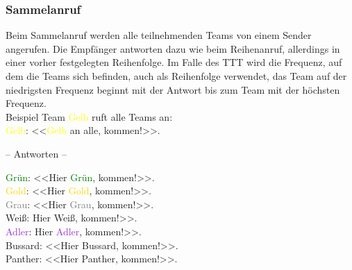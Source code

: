 \subsubsection{Sammelanruf}
Beim Sammelanruf werden alle teilnehmenden Teams von einem Sender angerufen. Die Empfänger antworten dazu wie beim Reihenanruf, allerdings in einer vorher festgelegten Reihenfolge. Im Falle des TTT wird die Frequenz, auf dem die Teams sich befinden, auch als Reihenfolge verwendet, das Team auf der niedrigsten Frequenz beginnt mit der Antwort bis zum Team mit der höchsten Frequenz. \\
Beispiel Team \textcolor{yellow}{Gelb} ruft alle Teams an: \\
\textcolor{yellow}{Gelb}: <<\textcolor{yellow}{Gelb} an alle, kommen!>>. \\
\begin{center}
– Antworten – \\
\end{center}
\textcolor{green}{Grün}: <<Hier \textcolor{green}{Grün}, kommen!>>. \\
\textcolor{gold}{Gold}: <<Hier \textcolor{gold}{Gold}, kommen!>>. \\
\textcolor{gray}{Grau}: <<Hier \textcolor{gray}{Grau}, kommen!>>. \\
Weiß: Hier Weiß, kommen!>>. \\
\textcolor{DarkOrchid}{Adler}: Hier \textcolor{DarkOrchid}{Adler}, kommen!>>. \\
Bussard: <<Hier Bussard, kommen!>>. \\
Panther: <<Hier Panther, kommen!>>. \\

